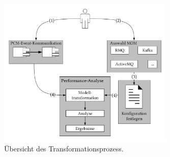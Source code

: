 \begin{figure}
\center
  \includegraphics[width=0.75\textwidth]{images/transformation/transformationOverview.pdf}
  \caption{Übersicht des Transformationsprozess.}
  \label{img:transformationOverview}
\end{figure}


